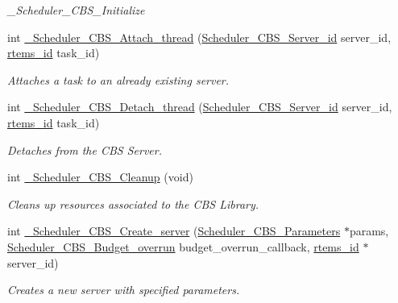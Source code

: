 \begin{DoxyCompactItemize}
\begin{DoxyCompactList}\small\item\em \+\_\+\+Scheduler\+\_\+\+C\+B\+S\+\_\+\+Initialize \end{DoxyCompactList}\item 
int \mbox{\hyperlink{group__RTEMSScoreSchedulerCBS_gad50adf7e8daf5e926a241e81c5468023}{\+\_\+\+Scheduler\+\_\+\+C\+B\+S\+\_\+\+Attach\+\_\+thread}} (\mbox{\hyperlink{group__RTEMSScoreSchedulerCBS_gaec8b0a87aaeee5befd176ed946ad60a7}{Scheduler\+\_\+\+C\+B\+S\+\_\+\+Server\+\_\+id}} server\+\_\+id, \mbox{\hyperlink{group__ClassicTasks_gab20892b814dced7dd4e5b9bf42becd57}{rtems\+\_\+id}} task\+\_\+id)
\begin{DoxyCompactList}\small\item\em Attaches a task to an already existing server. \end{DoxyCompactList}\item 
int \mbox{\hyperlink{group__RTEMSScoreSchedulerCBS_ga9f70f5f54408811d14c4fec717348443}{\+\_\+\+Scheduler\+\_\+\+C\+B\+S\+\_\+\+Detach\+\_\+thread}} (\mbox{\hyperlink{group__RTEMSScoreSchedulerCBS_gaec8b0a87aaeee5befd176ed946ad60a7}{Scheduler\+\_\+\+C\+B\+S\+\_\+\+Server\+\_\+id}} server\+\_\+id, \mbox{\hyperlink{group__ClassicTasks_gab20892b814dced7dd4e5b9bf42becd57}{rtems\+\_\+id}} task\+\_\+id)
\begin{DoxyCompactList}\small\item\em Detaches from the C\+BS Server. \end{DoxyCompactList}\item 
int \mbox{\hyperlink{group__RTEMSScoreSchedulerCBS_ga3229f13147960346f284d67dcb30feee}{\+\_\+\+Scheduler\+\_\+\+C\+B\+S\+\_\+\+Cleanup}} (void)
\begin{DoxyCompactList}\small\item\em Cleans up resources associated to the C\+BS Library. \end{DoxyCompactList}\item 
int \mbox{\hyperlink{group__RTEMSScoreSchedulerCBS_ga321aafe13a9f4b7815c5250789419dcd}{\+\_\+\+Scheduler\+\_\+\+C\+B\+S\+\_\+\+Create\+\_\+server}} (\mbox{\hyperlink{structScheduler__CBS__Parameters}{Scheduler\+\_\+\+C\+B\+S\+\_\+\+Parameters}} $\ast$params, \mbox{\hyperlink{group__RTEMSScoreSchedulerCBS_ga71e1a7a66ea3c1fcb7e25e900f773858}{Scheduler\+\_\+\+C\+B\+S\+\_\+\+Budget\+\_\+overrun}} budget\+\_\+overrun\+\_\+callback, \mbox{\hyperlink{group__ClassicTasks_gab20892b814dced7dd4e5b9bf42becd57}{rtems\+\_\+id}} $\ast$server\+\_\+id)
\begin{DoxyCompactList}\small\item\em Creates a new server with specified parameters. \end{DoxyCompactList}\item 

\end{DoxyCompactItemize}
